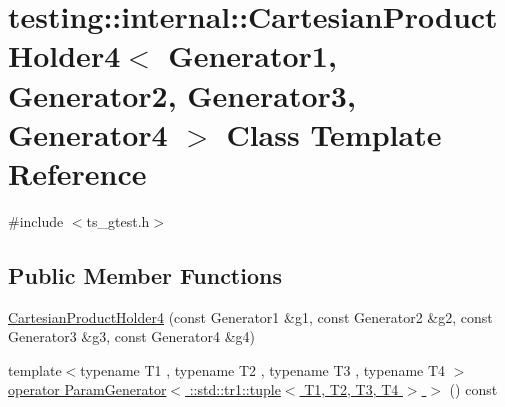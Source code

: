\hypertarget{classtesting_1_1internal_1_1CartesianProductHolder4}{\section{testing\-:\-:internal\-:\-:Cartesian\-Product\-Holder4$<$ Generator1, Generator2, Generator3, Generator4 $>$ Class Template Reference}
\label{classtesting_1_1internal_1_1CartesianProductHolder4}
}


{\ttfamily \#include $<$ts\-\_\-gtest.\-h$>$}

\subsection*{Public Member Functions}
\begin{DoxyCompactItemize}
\item 
\hyperlink{classtesting_1_1internal_1_1CartesianProductHolder4_a07fe92a091d7717a159d7ba5f2fe3c75}{Cartesian\-Product\-Holder4} (const Generator1 \&g1, const Generator2 \&g2, const Generator3 \&g3, const Generator4 \&g4)
\item 
{\footnotesize template$<$typename T1 , typename T2 , typename T3 , typename T4 $>$ }\\\hyperlink{classtesting_1_1internal_1_1CartesianProductHolder4_a6cd9d04e5e62c3fe810f1909ebd21c59}{operator Param\-Generator$<$ \-::std\-::tr1\-::tuple$<$ T1, T2, T3, T4 $>$ $>$} () const 
\end{DoxyCompactItemize}


